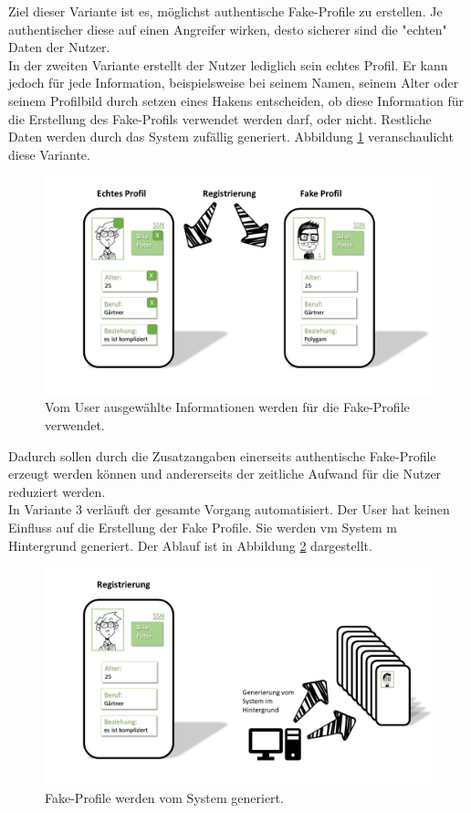 \documentclass{sigchi}
\begin{document}
Ziel dieser Variante ist es, möglichst authentische Fake-Profile zu erstellen. Je authentischer diese auf einen Angreifer wirken, desto sicherer sind die "echten" Daten der Nutzer. \\
In der zweiten Variante erstellt der Nutzer lediglich sein echtes Profil. Er kann jedoch für jede Information, beispielsweise bei seinem Namen, seinem Alter oder seinem Profilbild durch setzen eines Hakens entscheiden, ob diese Information für die Erstellung des Fake-Profils verwendet werden darf, oder nicht. Restliche Daten werden durch das System zufällig generiert. Abbildung \ref{fig:Umsetzung2} veranschaulicht diese Variante. 
\begin{figure}[htbp]
	\includegraphics[width=0.8\columnwidth]{figures/Umsetzung2.PNG}
	\caption{Vom User ausgewählte Informationen werden für die Fake-Profile verwendet.}
	\label{fig:Umsetzung2}
\end{figure}
Dadurch sollen durch die Zusatzangaben einerseits authentische Fake-Profile erzeugt werden können und andererseits der zeitliche Aufwand für die Nutzer reduziert werden. \\
In Variante 3 verläuft der gesamte Vorgang automatisiert. Der User hat keinen Einfluss auf die Erstellung der Fake Profile. Sie werden vm System m Hintergrund generiert. Der Ablauf ist in Abbildung \ref{fig:Umsetzung3} dargestellt.
\begin{figure}[htbp]
	\includegraphics[width=0.8\columnwidth]{figures/Umsetzung3.PNG}
	\caption{Fake-Profile werden vom System generiert.}
	\label{fig:Umsetzung3}
\end{figure}
\end{document}
